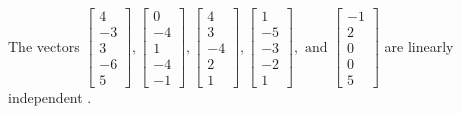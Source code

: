 \begin{exercise}
\begin{exerciseStatement}
  \end{exerciseStatement}
  \begin{exerciseAnswer}
   The vectors \(\left[\begin{array}{r}
4 \\
-3 \\
3 \\
-6 \\
5
\end{array}\right] , \left[\begin{array}{r}
0 \\
-4 \\
1 \\
-4 \\
-1
\end{array}\right] , \left[\begin{array}{r}
4 \\
3 \\
-4 \\
2 \\
1
\end{array}\right] , \left[\begin{array}{r}
1 \\
-5 \\
-3 \\
-2 \\
1
\end{array}\right] , \text{ and } \left[\begin{array}{r}
-1 \\
2 \\
0 \\
0 \\
5
\end{array}\right]\) are 
  	 linearly independent  .
  


  \end{exerciseAnswer}
\end{exercise}